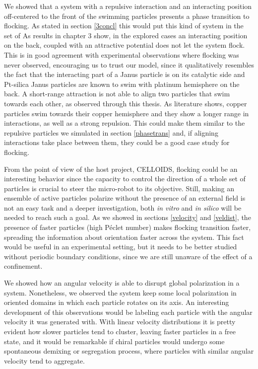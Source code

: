 \documentclass[../../master_thesis_np.tex]{subfiles}
\begin{document}
We showed that a system with a repulsive interaction and an interacting position off-centered to the front of the swimming particles presents a phase transition to flocking.
As stated in section \ref{3concl} this would put this kind of system in the set of 
As results in chapter 3 show, in the explored cases an interacting position on the back, coupled with an attractive potential does not let the system flock.
This is in good agreement with experimental observations where flocking was never observed, encouraging us to trust our model, since it qualitatively resembles the fact that the interacting part of a Janus particle is on its catalytic side and Pt-silica Janus particles are known to swim with platinum hemisphere on the back.
A short-range attraction is not able to align two particles that swim towards each other, as observed through this thesis.
As literature \cite{sharan_pair_2023} shows, copper particles swim towards their copper hemisphere and they show a longer range in interactions, as well as a strong repulsion.
This could make them similar to the repulsive particles we simulated in section \ref{phasetrans} and, if aligning interactions take place between them, they could be a good case study for flocking.

From the point of view of the host project, CELLOIDS, flocking could be an interesting behavior since the capacity to control the direction of a whole set of particles is crucial to steer the micro-robot to its objective.
Still, making an ensemble of active particles polarize without the presence of an external field is not an easy task and a deeper investigation, both \emph{in vitro} and \emph{in silico} will be needed to reach such a goal.
As we showed in sections \ref{velocity} and \ref{veldist}, the presence of faster particles (high Péclet number) makes flocking transition faster, spreading the information about orientation faster across the system.
This fact would be useful in an experimental setting, but it needs to be better studied without periodic boundary conditions, since we are still unaware of the effect of a confinement.

We showed how an angular velocity is able to disrupt global polarization in a system. 
Nonetheless, we observed the system keep some local polarization in oriented domains in which each particle rotates on its axis.
An interesting development of this observations would be labeling each particle with the angular velocity it was generated with.
With linear velocity distributions it is pretty evident how slower particles tend to cluster, leaving faster particles in a free state, and it would be remarkable if chiral particles would undergo some spontaneous demixing or segregation process, where particles with similar angular velocity tend to aggregate.
\end{document}
